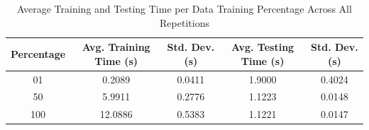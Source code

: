 \begin{table}[h]
\centering
\caption{Average Training and Testing Time per Data Training Percentage Across All Repetitions}
\begin{tabular}{c|cc|cc}
\toprule
Percentage & Avg. Training Time (s) & Std. Dev. (s) & Avg. Testing Time (s) & Std. Dev. (s) \\
\midrule
01 & 0.2089 & 0.0411 & 1.9000 & 0.4024 \\
50 & 5.9911 & 0.2776 & 1.1223 & 0.0148 \\
100 & 12.0886 & 0.5383 & 1.1221 & 0.0147 \\
\bottomrule
\end{tabular}
\end{table}
